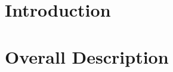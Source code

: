 \documentclass{config/PoliMi3i_thesis}
\begin{document}
\startpreamble
\setcounter{page}{1} %


\thispagestyle{empty}
\tableofcontents %
\thispagestyle{empty}
\cleardoublepage

%
%
%    
%

\mainmatter %


\chapter{Introduction}


\chapter{Overall Description}

\end{document}
